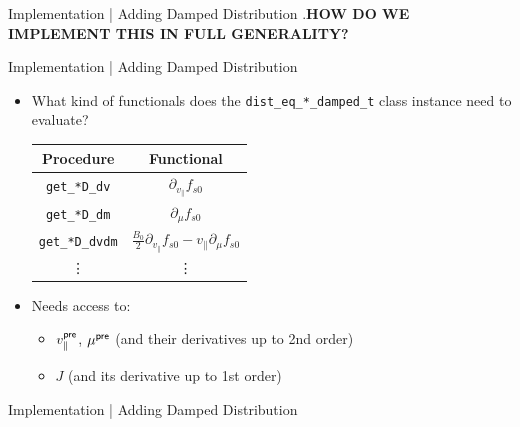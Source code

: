     \begin{frame}{Implementation | Adding Damped Distribution}
        \vspace{4mm}
        .{\bf HOW DO WE IMPLEMENT THIS IN FULL GENERALITY?}  \pause
        \vspace{2mm}
        
        
    \end{frame}
    
    \begin{frame}{Implementation | Adding Damped Distribution}
        \begin{itemize}
            \item  What kind of functionals does the {\tt dist\_eq\_*\_damped\_t} class instance need to evaluate?
            \begin{center}\begin{tabular}{ c | c }
                Procedure  &  Functional  \\
                \hline\hline
                {\tt get\_*D\_dv}  &  $\partial_{v_{\parallel}}f_{s0}$  \\
                \hline
                {\tt get\_*D\_dm}  &  $\partial_{\mu}f_{s0}$  \\
                \hline
                {\tt get\_*D\_dvdm}  &  $\frac{B_{0}}{2}\partial_{v_{\parallel}}f_{s0} - v_{\parallel}\partial_{\mu}f_{s0}$  \\
                \hline
                \vdots  &  \vdots  \\
            \end{tabular}\end{center}  \pause

            \item  Needs access to:
            \begin{itemize}
                \item  $v_{\parallel}^{\sf pre}$, $\mu^{\sf pre}$ (and their derivatives up to 2nd order)
                \item  $J$ (and its derivative up to 1st order)
            \end{itemize}
        \end{itemize}
    \end{frame}
    
    \begin{frame}{Implementation | Adding Damped Distribution}
        \vspace{2mm}
        
    \end{frame}
    
